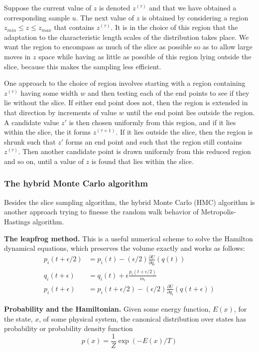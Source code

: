 \documentclass[a4paper]{report}
\begin{document}
Suppose the current value of $z$ is denoted $z^{(\tau)}$ and that we have obtained a corresponding sample $u$. The next value of $z$ is obtained by considering a region $z_{min} \leq z \leq z_{max}$ that contains $z^{(\tau)}$. It is in the choice of this region that the adaptation to the characteristic length scales of the distribution takes place. We want the region to encompass as much of the slice as possible so as to allow large moves in $z$ space while having as little as possible of this region lying outside the slice, because this makes the sampling less efficient.

One approach to the choice of region involves starting with a region containing $z^{(\tau)}$ having some width $w$ and then testing each of the end points to see if they lie without the slice. If either end point does not, then the region is extended in that direction by increments of value $w$ until the end point lies outside the region. A candidate value $z'$ is then chosen uniformly from this region, and if it lies within the slice, the it forms $z^{(\tau+1)}$. If it lies outside the slice, then the region is shrunk such that $z'$ forms an end point and such that the region still contains $z^{(\tau)}$. Then another candidate point is drawn uniformly from this reduced region and so on, until a value of $z$ is found that lies within the slice.
\subsubsection{The hybrid Monte Carlo algorithm}
Besides the slice sampling algorithm, the hybrid Monte Carlo (HMC) algorithm is another approach trying to finesse the random walk behavior of Metropolis-Hastings algorithm.

\textbf{The leapfrog method.} This is a useful numerical scheme to solve the Hamilton dynamical equations, which preserves the volume exactly and works as follows:
\begin{align}
	p_i(t+\epsilon/2) &= p_i(t) - (\epsilon/2)\frac{\partial U}{\partial q_i} (q(t)) \\
	q_i(t+ \epsilon) &= q_i(t) + \epsilon \frac{p_i(t+\epsilon/2)}{m_i} \\
	p_i(t+\epsilon) &= p_i(t+\epsilon/2) - (\epsilon/2)\frac{\partial U}{\partial q_i}(q(t+\epsilon))
\end{align}

\textbf{Probability and the Hamiltonian.} Given some energy function, $E(x)$, for the state, $x$, of some physical system, the canonical distribution over states has probability or probability density function
\begin{equation}
	p(x) = \frac{1}{Z} \exp (-E(x)/T)
\end{equation}
\end{document}
